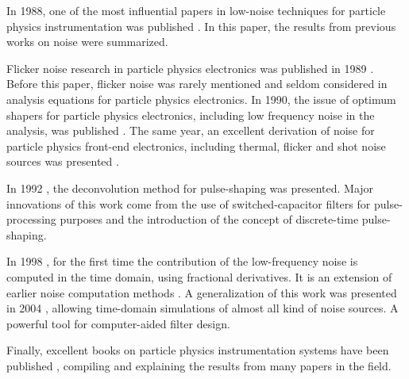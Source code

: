In 1988, one of the most influential papers in low-noise techniques for particle physics instrumentation was published \citep{radeka101}. In this paper, the results from previous works on noise were summarized.

Flicker noise research in particle physics electronics was published in 1989 \citep{lutz101}. Before this paper, flicker noise was rarely mentioned and seldom considered in analysis equations for particle physics electronics. In 1990, the issue of optimum shapers for particle physics electronics, including low frequency noise in the analysis, was published \citep{gatti104}. The same year, an excellent derivation of noise for particle physics front-end electronics, including thermal, flicker and shot noise sources was presented \citep{sansen101}.

In 1992 \citep{gadomski101}, the deconvolution method for pulse-shaping was presented. Major innovations of this work come from the use of switched-capacitor filters for \mbox{pulse-processing} purposes and the introduction of the concept of \mbox{discrete-time} \mbox{pulse-shaping}.

In 1998 \citep{pullia104}, for the first time the contribution of the low-frequency noise is computed in the time domain, using fractional derivatives. It is an extension of earlier noise computation methods \citep{goulding101}. A generalization of this work was presented in 2004 \citep{pullia102}, allowing time-domain simulations of almost all kind of noise sources.  A powerful tool for computer-aided filter design.



Finally, excellent books on particle physics instrumentation systems have been published \citep{radeka201}, compiling and explaining the results from many papers in the field.


